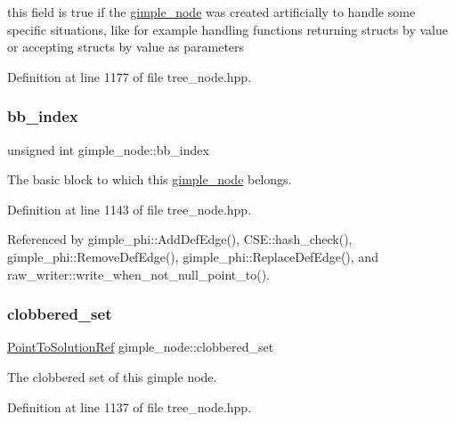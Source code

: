 this field is true if the \hyperlink{structgimple__node}{gimple\+\_\+node} was created artificially to handle some specific situations, like for example handling functions returning structs by value or accepting structs by value as parameters 



Definition at line 1177 of file tree\+\_\+node.\+hpp.

\mbox{\label{structgimple__node_a1e7e788aa8bc698b56e81bb33180648c}} 
\subsubsection{\texorpdfstring{bb\+\_\+index}{bb\_index}}
{\footnotesize\ttfamily unsigned int gimple\+\_\+node\+::bb\+\_\+index}



The basic block to which this \hyperlink{structgimple__node}{gimple\+\_\+node} belongs. 



Definition at line 1143 of file tree\+\_\+node.\+hpp.



Referenced by gimple\+\_\+phi\+::\+Add\+Def\+Edge(), C\+S\+E\+::hash\+\_\+check(), gimple\+\_\+phi\+::\+Remove\+Def\+Edge(), gimple\+\_\+phi\+::\+Replace\+Def\+Edge(), and raw\+\_\+writer\+::write\+\_\+when\+\_\+not\+\_\+null\+\_\+point\+\_\+to().

\mbox{\label{structgimple__node_aea4174753eb2c9916562456f947a78b0}} 
\subsubsection{\texorpdfstring{clobbered\+\_\+set}{clobbered\_set}}
{\footnotesize\ttfamily \hyperlink{tree__node_8hpp_a4b5be0c528f25b8cb0b0fbc3b957d725}{Point\+To\+Solution\+Ref} gimple\+\_\+node\+::clobbered\+\_\+set}



The clobbered set of this gimple node. 



Definition at line 1137 of file tree\+\_\+node.\+hpp.



